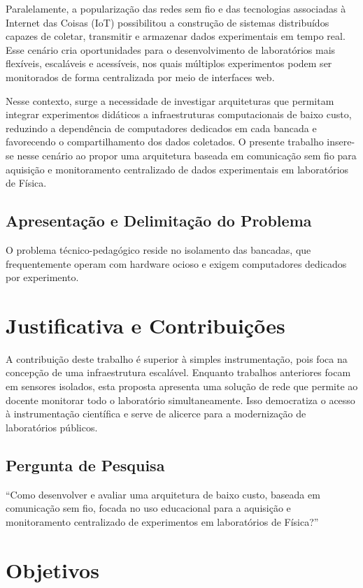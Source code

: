 Paralelamente, a popularização das redes sem fio e das tecnologias associadas à Internet das Coisas (IoT) possibilitou a construção de sistemas distribuídos capazes de coletar, transmitir e armazenar dados experimentais em tempo real. Esse cenário cria oportunidades para o desenvolvimento de laboratórios mais flexíveis, escaláveis e acessíveis, nos quais múltiplos experimentos podem ser monitorados de forma centralizada por meio de interfaces web.

Nesse contexto, surge a necessidade de investigar arquiteturas que permitam integrar experimentos didáticos a infraestruturas computacionais de baixo custo, reduzindo a dependência de computadores dedicados em cada bancada e favorecendo o compartilhamento dos dados coletados. O presente trabalho insere-se nesse cenário ao propor uma arquitetura baseada em comunicação sem fio para aquisição e monitoramento centralizado de dados experimentais em laboratórios de Física.


\subsection{Apresentação e Delimitação do Problema}
O problema técnico-pedagógico reside no isolamento das bancadas, que frequentemente operam com hardware ocioso e exigem computadores dedicados por experimento.

\section{Justificativa e Contribuições}
A contribuição deste trabalho é superior à simples instrumentação, pois foca na concepção de uma infraestrutura escalável. Enquanto trabalhos anteriores focam em sensores isolados, esta proposta apresenta uma solução de rede que permite ao docente monitorar todo o laboratório simultaneamente. Isso democratiza o acesso à instrumentação científica e serve de alicerce para a modernização de laboratórios públicos.

\subsection{Pergunta de Pesquisa}
“Como desenvolver e avaliar uma arquitetura de baixo custo, baseada em comunicação sem fio, focada no uso educacional para a aquisição e monitoramento centralizado de experimentos em laboratórios de Física?”

\section{Objetivos}

